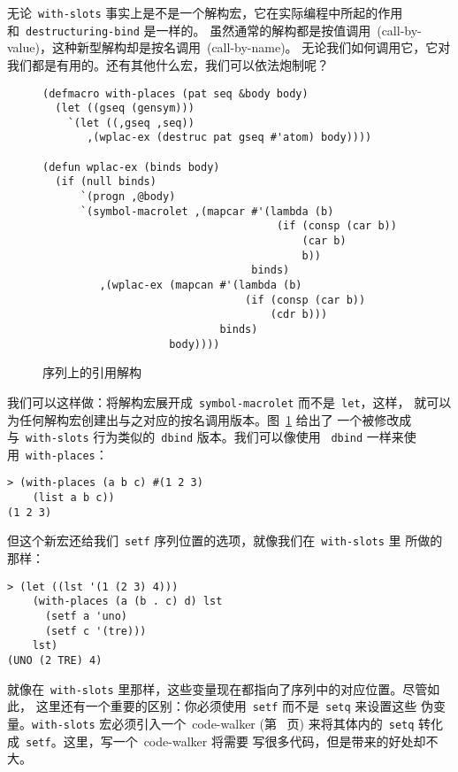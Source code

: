 无论~\texttt{with-slots} 事实上是不是一个解构宏，它在实际编程中所起的作用和~\texttt{destructuring-bind} 是一样的。
虽然通常的解构都是按值调用~(call-by-value)，这种新型解构却是按名调用~(call-by-name)。
无论我们如何调用它，它对我们都是有用的。还有其他什么宏，我们可以依法炮制呢？

\begin{figure}
\begin{lstlisting}
(defmacro with-places (pat seq &body body)
  (let ((gseq (gensym)))
    `(let ((,gseq ,seq))
       ,(wplac-ex (destruc pat gseq #'atom) body))))

(defun wplac-ex (binds body)
  (if (null binds)
      `(progn ,@body)
      `(symbol-macrolet ,(mapcar #'(lambda (b)
                                     (if (consp (car b))
                                         (car b)
                                         b))
                                 binds)
         ,(wplac-ex (mapcan #'(lambda (b)
                                (if (consp (car b))
                                    (cdr b)))
                            binds)
                    body))))
\end{lstlisting}
  \caption{序列上的引用解构}
  \label{fig:reference_destructuring_on_sequences}
\end{figure}

我们可以这样做：将解构宏展开成~\texttt{symbol-macrolet} 而不是~\texttt{let}，这样，
就可以为任何解构宏创建出与之对应的按名调用版本。图~\ref{fig:reference_destructuring_on_sequences} 给出了
一个被修改成与~\texttt{with-slots} 行为类似的~\texttt{dbind} 版本。我们可以像使用
~\texttt{dbind} 一样来使用~\texttt{with-places}：
\begin{lstlisting}
> (with-places (a b c) #(1 2 3)
    (list a b c))
(1 2 3)
\end{lstlisting}
但这个新宏还给我们~\texttt{setf} 序列位置的选项，就像我们在~\texttt{with-slots} 里
所做的那样：
\begin{lstlisting}
> (let ((lst '(1 (2 3) 4)))
    (with-places (a (b . c) d) lst
      (setf a 'uno)
      (setf c '(tre)))
    lst)
(UNO (2 TRE) 4)
\end{lstlisting}
就像在~\texttt{with-slots} 里那样，这些变量现在都指向了序列中的对应位置。尽管如此，
这里还有一个重要的区别：你必须使用~\texttt{setf} 而不是~\texttt{setq} 来设置这些
伪变量。\texttt{with-slots} 宏必须引入一个~code-walker
(第~\pageref{expl:code-walker}
页) 来将其体内的~\texttt{setq} 转化成~\texttt{setf}。这里，写一个~code-walker 将需要
写很多代码，但是带来的好处却不大。

